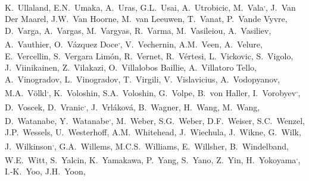\begin{flushleft}
K.~Ullaland\And, 
E.N.~Umaka\And, 
A.~Uras\And, 
G.L.~Usai\And, 
A.~Utrobicic\And, 
M.~Vala\textsuperscript{,}\And, 
J.~Van Der Maarel\And, 
J.W.~Van Hoorne\And, 
M.~van Leeuwen\And, 
T.~Vanat\And, 
P.~Vande Vyvre\And, 
D.~Varga\And, 
A.~Vargas\And, 
M.~Vargyas\And, 
R.~Varma\And, 
M.~Vasileiou\And, 
A.~Vasiliev\And, 
A.~Vauthier\And, 
O.~V\'azquez Doce\textsuperscript{,}\And, 
V.~Vechernin\And, 
A.M.~Veen\And, 
A.~Velure\And, 
E.~Vercellin\And, 
S.~Vergara Lim\'on\And, 
R.~Vernet\And, 
R.~V\'ertesi\And, 
L.~Vickovic\And, 
S.~Vigolo\And, 
J.~Viinikainen\And, 
Z.~Vilakazi\And, 
O.~Villalobos Baillie\And, 
A.~Villatoro Tello\And, 
A.~Vinogradov\And, 
L.~Vinogradov\And, 
T.~Virgili\And, 
V.~Vislavicius\And, 
A.~Vodopyanov\And, 
M.A.~V\"{o}lkl\textsuperscript{,}\And, 
K.~Voloshin\And, 
S.A.~Voloshin\And, 
G.~Volpe\And, 
B.~von Haller\And, 
I.~Vorobyev\textsuperscript{,}\And, 
D.~Voscek\And, 
D.~Vranic\textsuperscript{,}\And, 
J.~Vrl\'{a}kov\'{a}\And, 
B.~Wagner\And, 
H.~Wang\And, 
M.~Wang\And, 
D.~Watanabe\And, 
Y.~Watanabe\textsuperscript{,}\And, 
M.~Weber\And, 
S.G.~Weber\And, 
D.F.~Weiser\And, 
S.C.~Wenzel\And, 
J.P.~Wessels\And, 
U.~Westerhoff\And, 
A.M.~Whitehead\And, 
J.~Wiechula\And, 
J.~Wikne\And, 
G.~Wilk\And, 
J.~Wilkinson\textsuperscript{,}\And, 
G.A.~Willems\And, 
M.C.S.~Williams\And, 
E.~Willsher\And, 
B.~Windelband\And, 
W.E.~Witt\And, 
S.~Yalcin\And, 
K.~Yamakawa\And, 
P.~Yang\And, 
S.~Yano\And, 
Z.~Yin\And, 
H.~Yokoyama\textsuperscript{,}\And, 
I.-K.~Yoo\And, 
J.H.~Yoon\And, 

\end{flushleft}

